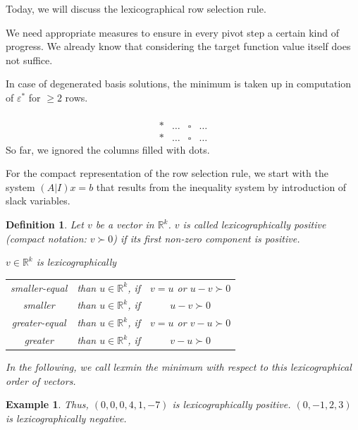 \documentclass{article}
\numberwithin{lecref}{section}
\newtheorem*{Example}{Example}
\newtheorem*{Definition}{Definition}
\begin{document}
Today, we will discuss the lexicographical row selection rule.

We need appropriate measures to ensure in every pivot step a certain kind of progress.
We already know that considering the target function value itself does not suffice.

In case of degenerated basis solutions, the minimum is taken up in computation of $\varepsilon^*$ for $\geq 2$ rows.

\[
	\begin{array}{c|ccc}
			& & & \\
	\hline
		* & \dots & \square & \dots \\
		* & \dots & \square & \dots
	\end{array}
\]
So far, we ignored the columns filled with dots.

For the compact representation of the row selection rule, we start with the system $(A|I) x = b$ that results from the inequality system by introduction of slack variables.

\begin{Definition}
	Let $v$ be a vector in $\mathbb R^k$.
	$v$ is called \emph{lexicographically positive} (compact notation: $v \succ 0$)
	if its first non-zero component is positive.

	$v \in \mathbb R^k$ is lexicographically
	\begin{tabular}{ccc}
		smaller-equal & than $u \in \mathbb R^k$, if & $v = u$ or $u - v \succ 0$ \\
		smaller       & than $u \in \mathbb R^k$, if & $u - v \succ 0$ \\
		greater-equal & than $u \in \mathbb R^k$, if & $v = u$ or $v - u \succ 0$ \\
		greater       & than $u \in \mathbb R^k$, if & $v - u \succ 0$ \\
	\end{tabular}

	In the following, we call \emph{lexmin} the minimum with respect to this lexicographical order of vectors.
\end{Definition}

\begin{Example}
	Thus, $(0,0,0,4,1,-7)$ is lexicographically positive.
	$(0, -1, 2, 3)$ is lexicographically negative.
\end{Example}
\end{document}
